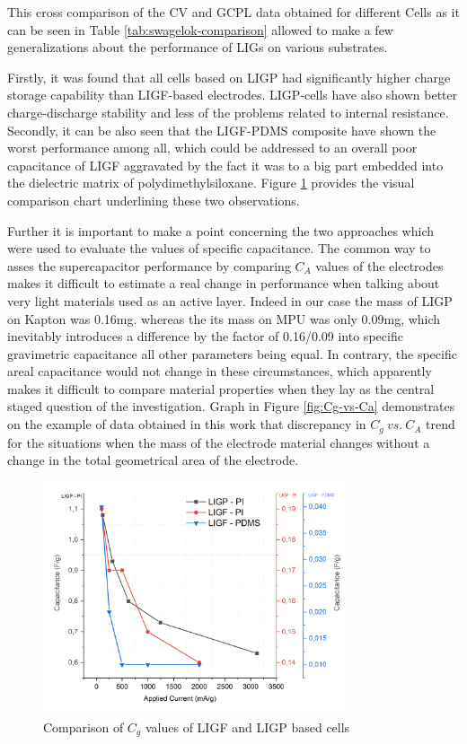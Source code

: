 This cross comparison of the CV and GCPL data obtained for different Cells as it can be seen in Table \ref{tab:swagelok-comparison} allowed to make a few generalizations about the performance of LIGs on various substrates.

Firstly, it was found that all cells based on LIGP had significantly higher charge storage capability than LIGF-based electrodes. LIGP-cells have also shown better charge-discharge stability and less of the problems related to internal resistance.  Secondly, it can be also seen that the LIGF-PDMS composite have shown the worst performance among all, which could be addressed to an overall poor capacitance of LIGF aggravated by the fact it was to a big part embedded into the dielectric matrix of polydimethylsiloxane. Figure \ref{fig:LIGF-cells-C_g} provides the visual comparison chart underlining these two observations.

Further it is important to make a point concerning the two approaches which were used to evaluate the values of specific capacitance. The common way to asses the supercapacitor performance by comparing $C_A$ values of the electrodes makes it difficult to estimate a real change in performance when talking about very light materials used as an active layer. Indeed in our case the mass of LIGP on Kapton was 0.16\:mg. whereas the its mass on MPU was only 0.09\:mg, which inevitably introduces a difference by the factor of 0.16/0.09 into specific gravimetric capacitance all other parameters being equal. In contrary, the specific areal capacitance would not change in these circumstances, which apparently makes it difficult to compare material properties when they lay as the central staged question of the investigation. Graph in Figure \ref{fig:Cg-vs-Ca} demonstrates on the example of data obtained in this work that discrepancy in $C_g\:vs.\:C_A$ trend for the situations when the mass of the electrode material changes without a change in the total geometrical area of the electrode.  

\begin{figure}[H]
\centering
\includegraphics[width=0.8\textwidth]{Figures/Results/Electrochemistry/Comparisons/Gr-Capacitance-vs-Current.jpg}
\medskip
\captionsetup{width=1\linewidth}
\caption{Comparison of $C_g$ values of LIGF and LIGP based cells}
\label{fig:LIGF-cells-C_g}
\end{figure}

